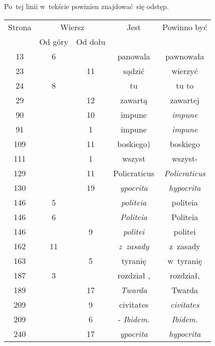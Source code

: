 \documentclass[a4paper,11pt]{article}
\begin{document}
\noindent
{} Po~tej linii w~tekście powinien znajdować~się odstęp.

\vspace{\spaceFour}





\newpage


\vspace{\spaceFive}


\begin{center}

  \begin{tabular}{|c|c|c|c|c|}
    \hline
    Strona & \multicolumn{2}{c|}{Wiersz} & Jest
                              & Powinno być \\ \cline{2-3}
    & Od góry & Od dołu & & \\
    \hline
    13  &  6 & & panowala & pawnowała \\
    23  & & 11 & sądzić & wierzyć \\
    24  &  8 & & tu & tu to \\
    29  & & 12 & zawartą & zawartej \\
    90  & & 10 & impune & \textit{impune} \\
    91  & &  1 & impune & \textit{impune} \\
    109 & & 11 & boskiego) & boskiego \\
    111 & &  1 & wszyst & wszyst- \\
    129 & & 11 & Policraticus & \textit{Policraticus} \\
    130 & & 19 & \textit{ypocrita} & \textit{hypocrita} \\
    146 &  5 & & \textit{politeia} & politeia \\
    146 &  6 & & \textit{Politeia}& Politeia \\
    146 & &  9 & \textit{politei} & politei \\
    162 & 11 & & \textit{z~zasady} & z~zasady \\
    163 & &  5 & tyranię & w~tyranię \\
    187 &  3 & & rozdział , & rozdział, \\
    189 & & 17 & \textit{Twarda} & Twarda \\
    209 & &  9 & civitates & \textit{civitates} \\
    209 & &  6 & - \textit{Ibidem.} & \textit{Ibidem.} \\
    240 & & 17 & \textit{ypocrita} & \textit{hypocrita} \\

\end{tabular}
\end{center}
\end{document}
